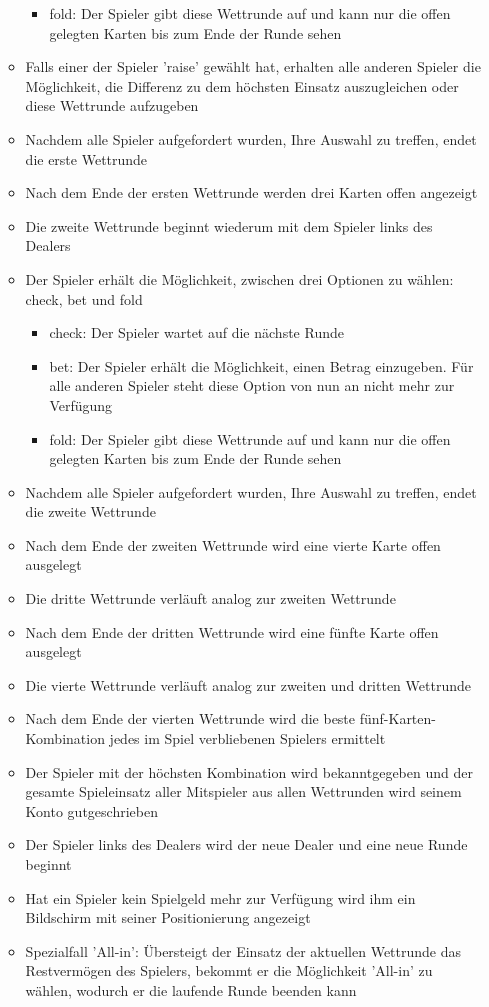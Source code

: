 \documentclass[a4paper,12pt,bibtotoc, parskip=full]{article}
\begin{document}
\begin{itemize}
\begin{itemize}
\begin{itemize}
        \item fold: Der Spieler gibt diese Wettrunde auf und kann nur die offen gelegten Karten bis zum Ende der Runde sehen
        \end{itemize}
    \item Falls einer der Spieler 'raise' gewählt hat, erhalten alle anderen Spieler die Möglichkeit, die Differenz zu dem höchsten Einsatz auszugleichen oder diese Wettrunde aufzugeben
    \item Nachdem alle Spieler aufgefordert wurden, Ihre Auswahl zu treffen, endet die erste Wettrunde
    \item Nach dem Ende der ersten Wettrunde werden drei Karten offen angezeigt
    \item Die zweite Wettrunde beginnt wiederum mit dem Spieler links des Dealers
    \item Der Spieler erhält die Möglichkeit, zwischen drei Optionen zu wählen: check, bet und fold
        \begin{itemize}
        \item check: Der Spieler wartet auf die nächste Runde
        \item bet: Der Spieler erhält die Möglichkeit, einen Betrag einzugeben. Für alle anderen Spieler steht diese Option von nun an nicht mehr zur Verfügung
        \item fold: Der Spieler gibt diese Wettrunde auf und kann nur die offen gelegten Karten bis zum Ende der Runde sehen
        \end{itemize}
    \item  Nachdem alle Spieler aufgefordert wurden, Ihre Auswahl zu treffen, endet die zweite Wettrunde
    \item Nach dem Ende der zweiten Wettrunde wird eine vierte Karte offen ausgelegt
    \item Die dritte Wettrunde verläuft analog zur zweiten Wettrunde
    \item Nach dem Ende der dritten Wettrunde wird eine fünfte Karte offen ausgelegt
    \item Die vierte Wettrunde verläuft analog zur zweiten und dritten Wettrunde
    \item Nach dem Ende der vierten Wettrunde wird die beste fünf-Karten-Kombination jedes im Spiel verbliebenen Spielers ermittelt
    \item Der Spieler mit der höchsten Kombination wird bekanntgegeben und der gesamte Spieleinsatz aller Mitspieler aus allen Wettrunden wird seinem Konto gutgeschrieben
    \item Der Spieler links des Dealers wird der neue Dealer und eine neue Runde beginnt
    \item Hat ein Spieler kein Spielgeld mehr zur Verfügung wird ihm ein Bildschirm mit seiner Positionierung angezeigt
    \item Spezialfall 'All-in': Übersteigt der Einsatz der aktuellen Wettrunde das Restvermögen des Spielers, bekommt er die Möglichkeit 'All-in' zu wählen, wodurch er die laufende Runde beenden kann  
    \end{itemize}
\end{itemize}
\end{document}
